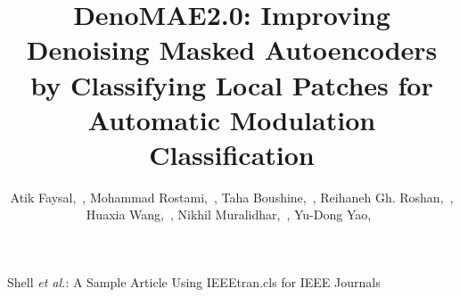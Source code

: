 \documentclass[journal]{IEEEtran}
\begin{document}
\title{DenoMAE2.0: Improving Denoising Masked Autoencoders by Classifying Local Patches for Automatic Modulation Classification}

\author{Atik Faysal,~, 
Mohammad Rostami,~,
Taha Boushine,~,
Reihaneh Gh. Roshan,~,
Huaxia Wang,~,
Nikhil Muralidhar,~,
Yu-Dong Yao,~
}

%
{Shell \MakeLowercase{\textit{et al.}}: A Sample Article Using IEEEtran.cls for IEEE Journals}


\maketitle
\end{document}
